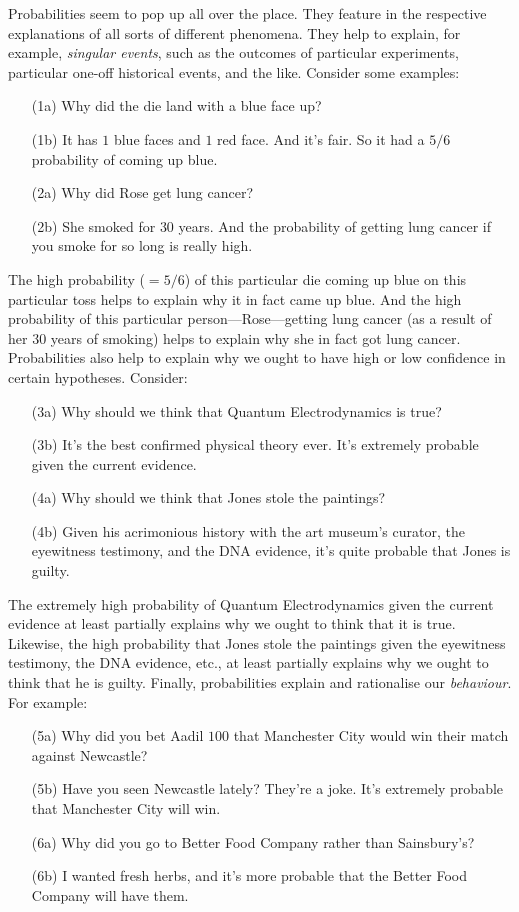 Probabilities seem to pop up all over the place. They feature in the respective explanations of all sorts of different phenomena. They help to explain, for example, \emph{singular events}, such as the outcomes of particular experiments, particular one-off historical events, and the like. Consider some examples:
\begin{enumerate}
\item[(1a)] Why did the die land with a blue face up?
\item[(1b)] It has $1$ blue faces and $1$ red face. And it's fair. So it had a $5/6$ probability of coming up blue.
\item[(2a)] Why did Rose get lung cancer?
\item[(2b)] She smoked for $30$ years. And the probability of getting lung cancer if you smoke for so long is really high.
\end{enumerate}
The high probability ($=5/6$) of this particular die coming up blue on this particular toss helps to explain why it in fact came up blue. And the high probability of this particular person---Rose---getting lung cancer (as a result of her $30$ years of smoking) helps to explain why she in fact got lung cancer. Probabilities also help to explain why we ought to have high or low confidence in certain hypotheses. Consider:
\begin{enumerate}
\item[(3a)] Why should we think that Quantum Electrodynamics is true?
\item[(3b)] It's the best confirmed physical theory ever. It's extremely probable given the current evidence.
\item[(4a)] Why should we think that Jones stole the paintings?
\item[(4b)] Given his acrimonious history with the art museum's curator, the eyewitness testimony, and the DNA evidence, it's quite probable that Jones is guilty.
\end{enumerate}
The extremely high probability of Quantum Electrodynamics given the current evidence at least partially explains why we ought to think that it is true. Likewise, the high probability that Jones stole the paintings given the eyewitness testimony, the DNA evidence, etc., at least partially explains why we ought to think that he is guilty. Finally, probabilities explain and rationalise our \emph{behaviour}. For example:
\begin{enumerate}
\item[(5a)] Why did you bet Aadil \textsterling$100$ that Manchester City would win their match against Newcastle?
\item[(5b)] Have you seen Newcastle lately? They're a joke. It's extremely probable that Manchester City will win.
\item[(6a)] Why did you go to Better Food Company rather than Sainsbury's?
\item[(6b)] I wanted fresh herbs, and it's more probable that the Better Food Company will have them.
\end{enumerate}
